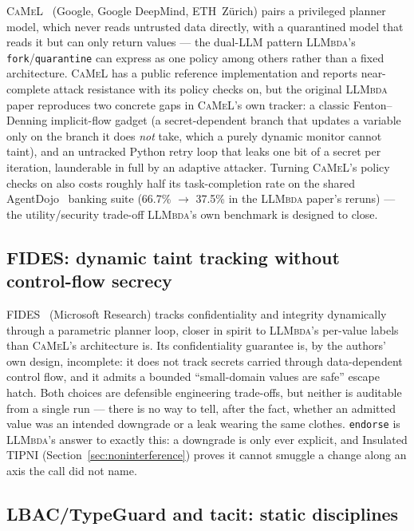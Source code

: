 \documentclass[11pt, a4paper]{article}
\newcommand{\LLMbda}{\textsc{LLMbda}\xspace}
\newcommand{\CaMeL}{\textsc{CaMeL}\xspace}
\newcommand{\FIDES}{\textsc{FIDES}\xspace}
\begin{document}
\CaMeL~\cite{camel} (Google, Google DeepMind, ETH~Z\"urich) pairs a
privileged planner model, which never reads untrusted data directly,
with a quarantined model that reads it but can only return values ---
the dual-LLM pattern  \LLMbda's \lstinline{fork}/\lstinline{quarantine}
can express as one policy among others rather than a fixed
architecture. \CaMeL has a public reference implementation and reports
near-complete attack resistance with its policy checks on, but the
original  \LLMbda paper reproduces two concrete gaps in \CaMeL's own
tracker: a classic Fenton--Denning implicit-flow gadget (a
secret-dependent branch that updates a variable only on the branch it
does \emph{not} take, which a purely dynamic monitor cannot taint), and
an untracked Python retry loop that leaks one bit of a secret per
iteration, launderable in full by an adaptive attacker. Turning \CaMeL's
policy checks on also costs roughly half its task-completion rate on
the shared AgentDojo~\cite{agentdojo} banking suite (66.7\%
$\rightarrow$ 37.5\% in the  \LLMbda paper's reruns) --- the
utility/security trade-off  \LLMbda's own benchmark is designed to close.

\subsection{\FIDES: dynamic taint tracking without control-flow secrecy}

\FIDES~\cite{fides} (Microsoft Research) tracks confidentiality and
integrity dynamically through a parametric planner loop, closer in
spirit to  \LLMbda's per-value labels than \CaMeL's architecture is. Its
confidentiality guarantee is, by the authors' own design, incomplete:
it does not track secrets carried through data-dependent control flow,
and it admits a bounded ``small-domain values are safe'' escape hatch.
Both choices are defensible engineering trade-offs, but neither is
auditable from a single run --- there is no way to tell, after the
fact, whether an admitted value was an intended downgrade or a leak
wearing the same clothes. \lstinline{endorse} is  \LLMbda's answer to
exactly this: a downgrade is only ever explicit, and Insulated TIPNI
(Section~\ref{sec:noninterference}) proves it cannot smuggle a change along an
axis the call did not name.

\subsection{LBAC/TypeGuard and tacit: static disciplines}
\end{document}

